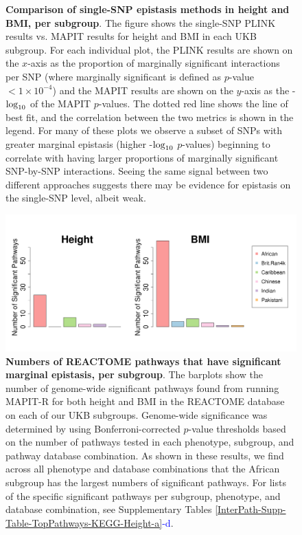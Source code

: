 \documentclass[12pt,a4paper]{article}
\def\log{{\rm log}}
\begin{document}
\begin{figure} [t!]
\caption[TBD]{\textbf{Comparison of single-SNP epistasis methods in height and BMI, per subgroup}. The figure shows the single-SNP PLINK results vs. MAPIT results for height and BMI in each UKB subgroup. For each individual plot, the PLINK results are shown on the $x$-axis as the proportion of marginally significant interactions per SNP (where marginally significant is defined as $p$-value $< 1\times10^{-4}$) and the MAPIT results are shown on the $y$-axis as the -$\log_{10}$ of the MAPIT $p$-values. The dotted red line shows the line of best fit, and the correlation between the two metrics is shown in the legend. For many of these plots we observe a subset of SNPs with greater marginal epistasis (higher -$\log_{10}$ $p$-values) beginning to correlate with having larger proportions of marginally significant SNP-by-SNP interactions. Seeing the same signal between two different approaches suggests there may be evidence for epistasis on the single-SNP level, albeit weak.}
\label{InterPath-Supp-Figure-MAPITvsPLINK-HeightBMI-All-caption}
\end{figure}
\clearpage

\begin{figure}[htbp]
\centering
\hspace*{-.9cm}
\includegraphics[scale=.45]{Images/Supp/InterPath_Supp_Figure_Barplots_REACTOME_vs2.png}
\caption[TBD]{\textbf{Numbers of REACTOME pathways that have significant marginal epistasis, per subgroup}. The barplots show the number of genome-wide significant pathways found from running MAPIT-R for both height and BMI in the REACTOME database on each of our UKB subgroups. Genome-wide significance was determined by using Bonferroni-corrected $p$-value thresholds based on the number of pathways tested in each phenotype, subgroup, and pathway database combination. As shown in these results, we find across all phenotype and database combinations that the African subgroup has the largest numbers of significant pathways. For lists of the specific significant pathways per subgroup, phenotype, and database combination, see Supplementary Tables \ref{InterPath-Supp-Table-TopPathways-KEGG-Height-a}\textcolor{blue}{-d}.}
\label{InterPath-Supp-Figure-Barplots-REACTOME}
\end{figure}
\clearpage
\end{document}
